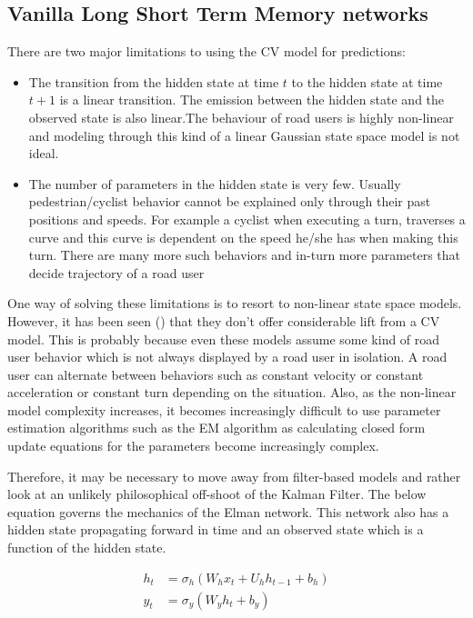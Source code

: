 \documentclass{article}
\begin{document}
\subsection{Vanilla Long Short Term Memory networks}\label{ssec:vanilla_lstm}

There are two major limitations to using the CV model for predictions:
\begin{itemize}
    \item The transition from the hidden state at time $t$ to the hidden state at time $t+1$ is a linear transition. The emission between the hidden state and the observed state is also linear.The behaviour of road users is highly non-linear and modeling through this kind of a linear Gaussian state space model is not ideal.
    \item The number of parameters in the hidden state is very few. Usually pedestrian/cyclist behavior cannot be explained only through their past positions and speeds. For example a cyclist when executing a turn, traverses a curve and this curve is dependent on the speed he/she has when making this turn.  There are many more such behaviors and in-turn more parameters that decide trajectory of a road user
\end{itemize}

One way of solving these limitations is to resort to non-linear state space models. However, it has been seen (\cite{hutchison_pedestrian_2013}) that they don't offer considerable lift from a CV model. This is probably because even these models assume some kind of road user behavior which is not always displayed by a road user in isolation. A road user can alternate between behaviors such as constant velocity or constant acceleration or constant turn depending on the situation. Also, as the non-linear model complexity increases, it becomes increasingly difficult to use parameter estimation algorithms such as the EM algorithm as calculating closed form update equations for the parameters become increasingly complex.

Therefore, it may be necessary to move away from filter-based models and rather look at an unlikely philosophical off-shoot of the Kalman Filter. The below equation governs the mechanics of the Elman network. This network also has a hidden state propagating forward in time and an observed state which is a function of the hidden state.

\begin{equation}
\begin{split}
    h_t&=\sigma_h(W_hx_t+U_{h}h_{t-1}+b_h)\\
    y_t&=\sigma_y(W_yh_t+b_y)
\end{split}
\end{equation}
\end{document}
